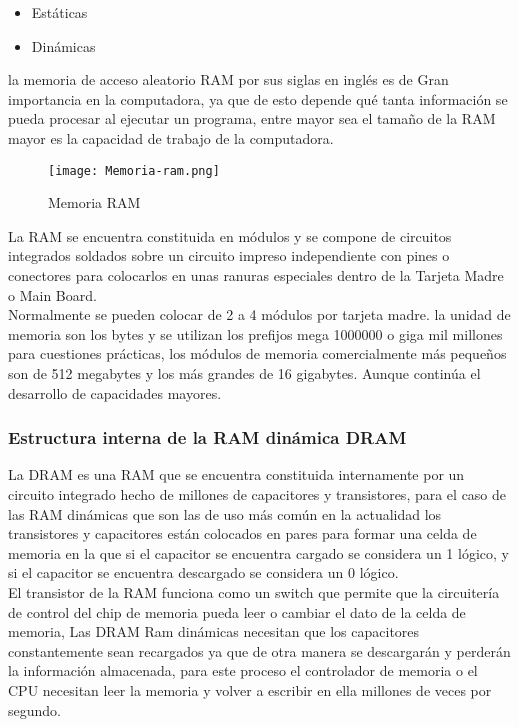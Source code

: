 \documentclass{article}
\begin{document}
\begin{itemize}
    \item Estáticas
    \item Dinámicas
\end{itemize}

la memoria de acceso aleatorio RAM por sus siglas en inglés es de Gran importancia en la computadora, ya que de esto depende qué tanta información se pueda procesar al ejecutar un programa, entre mayor sea el tamaño de la RAM mayor es la capacidad de trabajo de la computadora.\\


\begin{figure}[h]
\texttt{[image: Memoria-ram.png]}
\centering
\caption{Memoria RAM}
\label{fig:Memoria-ram}
\end{figure}


La RAM se encuentra constituida en módulos y se compone de circuitos integrados soldados sobre un circuito impreso independiente con pines o conectores para colocarlos en unas ranuras especiales dentro de la Tarjeta Madre o Main Board.\\

Normalmente se pueden colocar de 2 a 4 módulos por tarjeta madre. la unidad de memoria son los bytes y se utilizan los prefijos mega 1000000 o giga mil millones para cuestiones prácticas, los módulos de memoria comercialmente más pequeños son de 512 megabytes y los más grandes de 16 gigabytes. Aunque continúa el desarrollo de capacidades mayores.\\

\subsubsection{Estructura interna de la RAM dinámica DRAM}
La DRAM es una RAM que se encuentra constituida internamente por un circuito integrado hecho de millones de capacitores y transistores, para el caso de las RAM dinámicas que son las de uso más común en la actualidad los transistores y capacitores están colocados en pares para formar una celda de memoria en la que si el capacitor se encuentra cargado se considera un 1 lógico, y si el capacitor se encuentra descargado se considera un 0 lógico.\\

El transistor de la RAM funciona como un switch que permite que la circuitería de control del chip de memoria pueda leer o cambiar el dato de la celda de memoria, Las DRAM Ram dinámicas necesitan que los capacitores constantemente sean recargados ya que de otra manera se descargarán y perderán la información almacenada, para este proceso el controlador de memoria o el CPU necesitan leer la memoria y volver a escribir en ella millones de veces por segundo.\\
\end{document}

